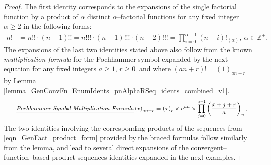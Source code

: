 \documentclass[12pt,reqno]{article}
\numberwithin{sfootnote}{section}
\numberwithin{equation}{section}
\newcommand{\tagtext}[1]{\tag*{\underline{\textit{#1}}}}
\theoremstyle{DefaultTheoremStyle}
\theoremstyle{definition}
\newcommand{\Pochhammer}[2]{\ensuremath{\left(#1\right)_{#2}}}
\newcommand{\AlphaFactorial}[2]{\ensuremath{\left(#1\right)!_{\left(#2\right)}}}
\begin{document}
\begin{proof} 
The first identity corresponds to the expansions of the 
single factorial function by a product of $\alpha$ distinct 
$\alpha$--factorial functions for any fixed integer $\alpha \geq 2$ in the 
following forms: 
\begin{align*} 
n! & = n!! \cdot (n-1)!! = n!!! \cdot (n-1)!!! \cdot (n-2)!!! 
     = \prod_{i=0}^{\alpha-1} \AlphaFactorial{n-i}{\alpha},\ 
     \alpha \in \mathbb{Z}^{+}. 
\end{align*} 
The expansions of the last two identities stated above also follow from the 
known \emph{multiplication formula} for the Pochhammer symbol 
expanded by the next equation \citep{WOLFRAMFNSSITE-INTRO-FACTBINOMS} 
for any fixed integers $a \geq 1$, $r \geq 0$, and where 
$(an+r)! = \Pochhammer{1}{an+r}$ by 
Lemma \ref{lemma_GenConvFn_EnumIdents_pnAlphaRSeq_idents_combined_v1}. 
\begin{align*} 
\tagtext{Pochhammer Symbol Multiplication Formula} 
\Pochhammer{x}{an+r} & = 
     \Pochhammer{x}{r} \times a^{an} \times 
     \prod_{j=0}^{a-1} \Pochhammer{\frac{x+j+r}{a}}{n}, 
\end{align*} 
The two identities involving the corresponding products of the 
sequences from \eqref{eqn_GenFact_product_form} 
provided by the braced formulas follow similarly from the lemma, and 
lead to several direct expansions of the convergent--function--based 
product sequences identities expanded in the next examples. 
\end{proof} 
\end{document}
